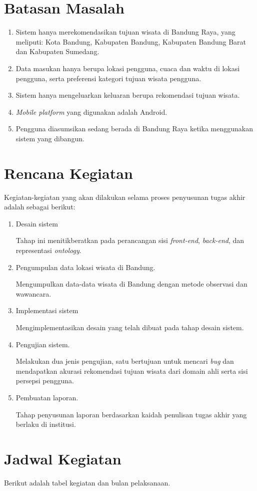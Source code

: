\section{Batasan Masalah}
\begin{enumerate}
	\item Sistem hanya merekomendasikan tujuan wisata di Bandung Raya, yang meliputi: Kota Bandung, Kabupaten Bandung, Kabupaten Bandung Barat dan Kabupaten Sumedang.
	\item Data masukan hanya berupa lokasi pengguna, cuaca  dan waktu di lokasi pengguna, serta preferensi kategori tujuan wisata pengguna.
	\item Sistem hanya mengeluarkan keluaran berupa rekomendasi tujuan wisata.
	\item \textit{Mobile platform} yang digunakan adalah Android.
	\item Pengguna diasumsikan sedang berada di Bandung Raya ketika menggunakan sistem yang dibangun. 
\end{enumerate}
\section{Rencana Kegiatan}
Kegiatan-kegiatan yang akan dilakukan selama proses penyusunan tugas akhir adalah sebagai berikut:
\begin{enumerate}
	\item Desain sistem
	\par
	Tahap ini menitikberatkan pada perancangan sisi \textit{front-end}, \textit{back-end}, dan representasi \textit{ontology}.
	\item Pengumpulan data lokasi wisata di Bandung.
	\par
	Mengumpulkan data-data wisata di Bandung dengan metode observasi dan wawancara.
	\item Implementasi sistem
	\par
	Mengimplementasikan desain yang telah dibuat pada tahap desain sistem.
	\item Pengujian sistem.
	\par
	Melakukan dua jenis pengujian, satu bertujuan untuk mencari \textit{bug} dan mendapatkan akurasi rekomendasi tujuan wisata dari domain ahli serta sisi 
	persepsi pengguna. 
	\item Pembuatan laporan.
	\par
	Tahap penyusunan laporan berdasarkan kaidah penulisan tugas akhir yang berlaku di institusi.
\end{enumerate}
\section{Jadwal Kegiatan}
Berikut adalah tabel kegiatan dan bulan pelaksanaan.
 
